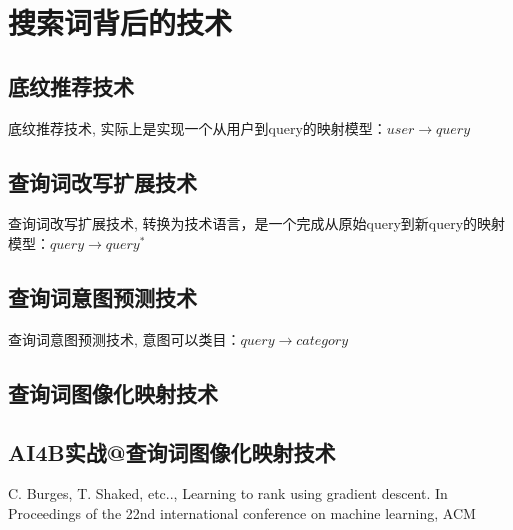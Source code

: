 
\chapter{搜索词背后的技术}
\thispagestyle{empty}

\setlength{\fboxrule}{0pt}\setlength{\fboxsep}{0cm}
\noindent\shadowbox{
\begin{tcolorbox}[arc=0mm,colback=lightblue,colframe=darkblue,title=学习目标与要求]

\end{tcolorbox}}
\setlength{\fboxrule}{1pt}\setlength{\fboxsep}{4pt} 


\section{底纹推荐技术} 
	底纹推荐技术, 实际上是实现一个从用户到query的映射模型：$user \to query$

\section{查询词改写扩展技术}
	查询词改写扩展技术, 转换为技术语言，是一个完成从原始query到新query的映射模型：$query \to query^*$
\section{查询词意图预测技术}
查询词意图预测技术, 意图可以类目：$query \to category$


\section{查询词图像化映射技术} 

\section{AI4B实战@查询词图像化映射技术} 


\begin{thebibliography}{99}
 C. Burges, T. Shaked, etc.., Learning to rank 
using gradient descent. In Proceedings of the 22nd international 
conference on machine learning, ACM
\end{thebibliography}

 
